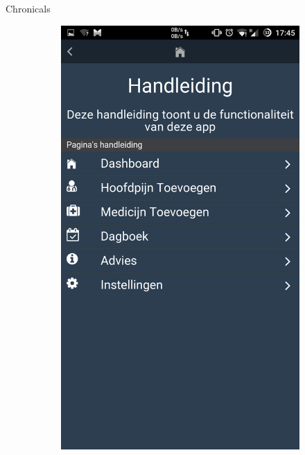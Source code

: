 \documentclass[english]{beamer}
\begin{document}
\begin{frame}{Chronicals}
\begin{figure}[!h]
\begin{subfigure}[b]{0.3\textwidth}
		\includegraphics[width=\textwidth]{figures/manual.png}
	\end{subfigure}
\end{figure}
\end{frame}
\end{document}
